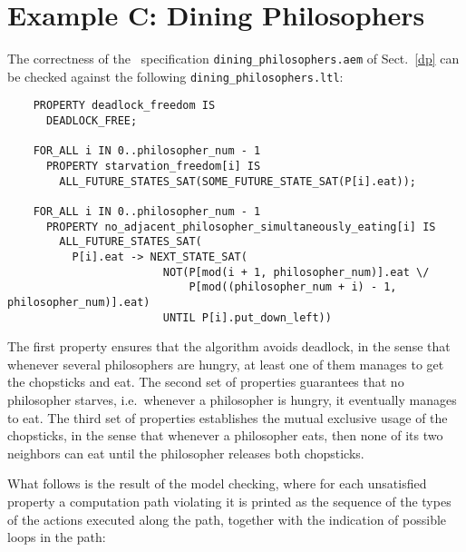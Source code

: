 \section{Example C: Dining Philosophers}

The correctness of the \aemilia\ specification {\tt dining\_philosophers.aem} of Sect.~\ref{dp} can be
checked against the following {\tt dining\_philosophers.ltl}:

	\begin{verbatim}
    PROPERTY deadlock_freedom IS
      DEADLOCK_FREE;

    FOR_ALL i IN 0..philosopher_num - 1
      PROPERTY starvation_freedom[i] IS
        ALL_FUTURE_STATES_SAT(SOME_FUTURE_STATE_SAT(P[i].eat));

    FOR_ALL i IN 0..philosopher_num - 1
      PROPERTY no_adjacent_philosopher_simultaneously_eating[i] IS
        ALL_FUTURE_STATES_SAT(
          P[i].eat -> NEXT_STATE_SAT(
                        NOT(P[mod(i + 1, philosopher_num)].eat \/
                            P[mod((philosopher_num + i) - 1, philosopher_num)].eat)
                        UNTIL P[i].put_down_left))
	\end{verbatim}

\noindent The first property ensures that the algorithm avoids deadlock, in the sense that whenever several
philosophers are hungry, at least one of them manages to get the chopsticks and eat. The second set of
properties guarantees that no philosopher starves, i.e.\ whenever a philosopher is hungry, it eventually
manages to eat. The third set of properties establishes the mutual exclusive usage of the chopsticks, in the
sense that whenever a philosopher eats, then none of its two neighbors can eat until the philosopher
releases both chopsticks.

What follows is the result of the model checking, where for each unsatisfied property a computation path
violating it is printed as the sequence of the types of the actions executed along the path, together with
the indication of possible loops in the path:

